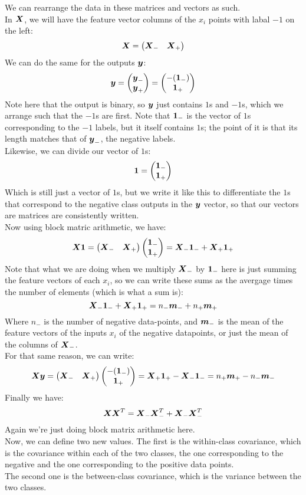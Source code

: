 \documentclass[12pt]{article}
\begin{document}
We can rearrange the data in these matrices and
vectors as such. \\
In $\boldsymbol{X}$, we will have the feature vector columns
of the $x_i$ points with labal $-1$ on the left:
\[ \boldsymbol{X} = \begin{pmatrix} \boldsymbol{X}_- & \boldsymbol{X}_+ \end{pmatrix} \]
We can do the same for the outputs $\boldsymbol{y}$:
\[ \boldsymbol{y} = \begin{pmatrix} \boldsymbol{y}_- \\ \boldsymbol{y}_+ \end{pmatrix}
= \begin{pmatrix} -(\boldsymbol{1}_-) \\ \boldsymbol{1}_+ \end{pmatrix} \]
Note here that the output is binary,
so $\boldsymbol{y}$ just contains $1$s and $-1$s,
which we arrange such that the $-1$s are first.
Note that $\boldsymbol{1}_-$ is the vector of $1$s
corresponding to the $-1$ labels, but it itself
contains $1$s; the point of it is that its length
matches that of $\boldsymbol{y}_-$, the negative labels. \\
Likewise, we can divide our vector of $1$s:
\[ \boldsymbol{1} = \begin{pmatrix} \boldsymbol{1}_- \\ \boldsymbol{1}_+ \end{pmatrix} \]
Which is still just a vector of $1$s,
but we write it like this to differentiate the $1$s
that correspond to the negative class outputs
in the $\boldsymbol{y}$ vector, so that our vectors are
matrices are consistently written. \\

Now using block matric arithmetic, we have:
\[ \boldsymbol{X}\boldsymbol{1} = \begin{pmatrix} \boldsymbol{X}_- & \boldsymbol{X}_+ \end{pmatrix}
\begin{pmatrix} \boldsymbol{1}_- \\ \boldsymbol{1}_+ \end{pmatrix} 
= \boldsymbol{X}_-\boldsymbol{1}_- + \boldsymbol{X}_+\boldsymbol{1}_+ \]
Note that what we are doing
when we multiply $\boldsymbol{X}_-$ by $\boldsymbol{1}_-$
here is just summing the feature vectors of each $x_i$,
so we can write these sums as the avergage times
the number of elements (which is what a sum is):
\[ \boldsymbol{X}_-\boldsymbol{1}_- + \boldsymbol{X}_+\boldsymbol{1}_+ 
= n_-\boldsymbol{m}_- + n_+\boldsymbol{m}_+ \]
Where $n_-$ is the number of negative data-points,
and $\boldsymbol{m}_-$ is the mean of the feature vectors
of the inputs $x_i$ of the negative datapoints,
or just the mean of the columns of $\boldsymbol{X}_-$. \\
For that same reason, we can write:
\[ \boldsymbol{X}\boldsymbol{y} = \begin{pmatrix} \boldsymbol{X}_- & \boldsymbol{X}_+ \end{pmatrix}
\begin{pmatrix} -(\boldsymbol{1}_-) \\ \boldsymbol{1}_+ \end{pmatrix} 
= \boldsymbol{X}_+\boldsymbol{1}_+ - \boldsymbol{X}_-\boldsymbol{1}_-
= n_+\boldsymbol{m}_+ - n_-\boldsymbol{m}_- \]
Finally we have:
\[ \boldsymbol{X}\boldsymbol{X}^T = \boldsymbol{X}_-\boldsymbol{X}^T_- + \boldsymbol{X}_-\boldsymbol{X}^T_- \]
Again we're just doing block matrix arithmetic here. \\

Now, we can define two new values.
The first is the within-class covariance, 
which is the covariance within each of the two
classes, the one corresponding to the negative
and the one corresponding to the positive data points. \\
The second one is the between-class covariance,
which is the variance between the two classes. \\
\end{document}
